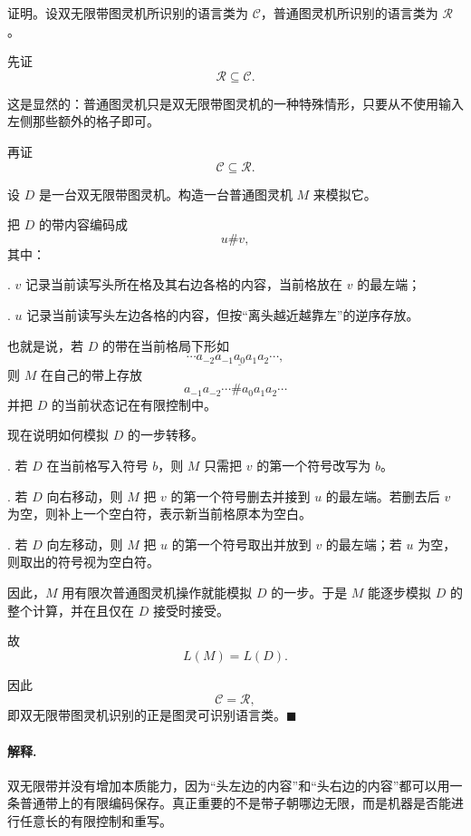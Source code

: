 \begin{answerred}
证明。设双无限带图灵机所识别的语言类为 $\mathcal C$，普通图灵机所识别的语言类为 $\mathcal R$。

\medskip
\noindent
先证
\[
    \mathcal R\subseteq \mathcal C.
\]

这是显然的：普通图灵机只是双无限带图灵机的一种特殊情形，只要从不使用输入左侧那些额外的格子即可。

\medskip
\noindent
再证
\[
    \mathcal C\subseteq \mathcal R.
\]

设 $D$ 是一台双无限带图灵机。构造一台普通图灵机 $M$ 来模拟它。

\medskip
把 $D$ 的带内容编码成
\[
    u\#v,
\]
其中：

\medskip
{}. $v$ 记录当前读写头所在格及其右边各格的内容，当前格放在 $v$ 的最左端；

\medskip
{}. $u$ 记录当前读写头左边各格的内容，但按“离头越近越靠左”的逆序存放。

\medskip
也就是说，若 $D$ 的带在当前格局下形如
\[
    \cdots a_{-2}a_{-1}\underline{a_0}a_1a_2\cdots,
\]
则 $M$ 在自己的带上存放
\[
    a_{-1}a_{-2}\cdots \# a_0a_1a_2\cdots
\]
并把 $D$ 的当前状态记在有限控制中。

\medskip
现在说明如何模拟 $D$ 的一步转移。

\medskip
{}. 若 $D$ 在当前格写入符号 $b$，则 $M$ 只需把 $v$ 的第一个符号改写为 $b$。

\medskip
{}. 若 $D$ 向右移动，则 $M$ 把 $v$ 的第一个符号删去并接到 $u$ 的最左端。若删去后 $v$ 为空，则补上一个空白符，表示新当前格原本为空白。

\medskip
{}. 若 $D$ 向左移动，则 $M$ 把 $u$ 的第一个符号取出并放到 $v$ 的最左端；若 $u$ 为空，则取出的符号视为空白符。

\medskip
因此，$M$ 用有限次普通图灵机操作就能模拟 $D$ 的一步。于是 $M$ 能逐步模拟 $D$ 的整个计算，并在且仅在 $D$ 接受时接受。

故
\[
    L(M)=L(D).
\]

因此
\[
    \mathcal C=\mathcal R,
\]
即双无限带图灵机识别的正是图灵可识别语言类。$\blacksquare$

\begin{answernote}
\paragraph{解释.}
双无限带并没有增加本质能力，因为“头左边的内容”和“头右边的内容”都可以用一条普通带上的有限编码保存。真正重要的不是带子朝哪边无限，而是机器是否能进行任意长的有限控制和重写。

\end{answernote}
\end{answerred}
